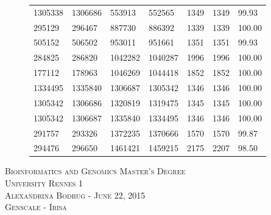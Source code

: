 \documentclass[12pt]{article}
\begin{document}
\begin{figure}[h!]
{\begin{tabular}{|l|l|l|l|l|l|l|}
1305338  & 1306686  & 553913   & 552565   & 1349        & 1349        & 99.93          \\
295129   & 296467   & 887730   & 886392   & 1339        & 1339        & 100.00         \\
505152   & 506502   & 953011   & 951661   & 1351        & 1351        & 99.93          \\
284825   & 286820   & 1042282  & 1040287  & 1996        & 1996        & 100.00         \\
177112   & 178963   & 1046269  & 1044418  & 1852        & 1852        & 100.00         \\
1334495  & 1335840  & 1306687  & 1305342  & 1346        & 1346        & 100.00         \\
1305342  & 1306686  & 1320819  & 1319475  & 1345        & 1345        & 100.00         \\
1305342  & 1306687  & 1335840  & 1334495  & 1346        & 1346        & 100.00         \\
291757   & 293326   & 1372235  & 1370666  & 1570        & 1570        & 99.87          \\
\rowcolor{red!10}
294476   & 296650   & 1461421  & 1459215  & 2175        & 2207        & 98.50         \\ \hline
\end{tabular}
}
\end{figure}


\clearpage
\begin{center}
\textsc{\Large Bioinformatics and Genomics Master's Degree\\ University Rennes 1}\\
\vspace*{0.1cm}
\textsc{Alexandrina Bodrug - June 22, 2015} \\
\vspace*{0.5cm}
\textsc{Genscale - Irisa}
\end{center}
\vspace*{2cm}
\end{document}

